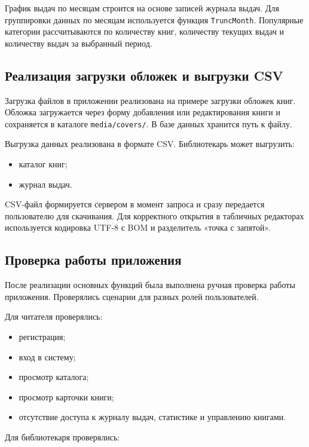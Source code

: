 График выдач по месяцам строится на основе записей журнала выдач. Для группировки данных по месяцам используется функция \texttt{TruncMonth}. Популярные категории рассчитываются по количеству книг, количеству текущих выдач и количеству выдач за выбранный период.

\subsection{Реализация загрузки обложек и выгрузки CSV}

Загрузка файлов в приложении реализована на примере загрузки обложек книг. Обложка загружается через форму добавления или редактирования книги и сохраняется в каталоге \texttt{media/covers/}. В базе данных хранится путь к файлу.

Выгрузка данных реализована в формате CSV. Библиотекарь может выгрузить:

\begin{itemize}
    \item каталог книг;
    \item журнал выдач.
\end{itemize}

CSV-файл формируется сервером в момент запроса и сразу передается пользователю для скачивания. Для корректного открытия в табличных редакторах используется кодировка UTF-8 с BOM и разделитель «точка с запятой».

\subsection{Проверка работы приложения}

После реализации основных функций была выполнена ручная проверка работы приложения. Проверялись сценарии для разных ролей пользователей.

Для читателя проверялись:

\begin{itemize}
    \item регистрация;
    \item вход в систему;
    \item просмотр каталога;
    \item просмотр карточки книги;
    \item отсутствие доступа к журналу выдач, статистике и управлению книгами.
\end{itemize}

Для библиотекаря проверялись:

